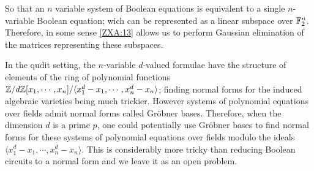 \documentclass[12pt]{ociamthesis}  %
\begin{document}
So that an $n$ variable system of Boolean equations is equivalent to a single $n$-variable Boolean equation; wich can be represented as a linear subspace over $\mathbb{F}_2^n$. Therefore, in some sense \ref{ZXA:13} allows us to perform Gaussian elimination of the matrices representing these subspaces.
 
In the qudit setting, the $n$-variable $d$-valued formulae have the structure of elements of the ring of polynomial functions $\mathbb{Z}/d\mathbb{Z}[x_1,\cdots, x_{n}]/\langle x_1^d-x_1,\cdots, x_n^d-x_n\rangle$; finding normal forms for the induced algebraic varieties being much trickier. 
However systems of polynomial equations over fields admit normal forms called Gr\"obner bases.  Therefore,  when the dimension $d$ is a prime $p$, one could potentially use  Gr\"obner bases to find normal forms for these systems of polynomial equations over fields  modulo the  ideals $\langle x_1^d-x_1,\cdots, x_n^d-x_n\rangle$.   This is considerably more tricky than reducing Boolean circuits to a normal form and we leave it as an open problem.

 

\end{document}
